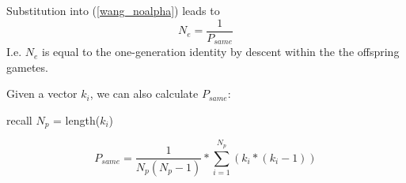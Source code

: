 \documentclass{article}
\begin{document}
\begin{description}
Substitution into (\ref{wang_noalpha}) leads to 
\begin{equation} 
N_e = \frac{1}{P_{same}}
\end{equation}
I.e. $N_e$ is equal to the one-generation identity by descent within the the offspring gametes.

\item Given a vector $k_i$, we can also calculate $P_{same}$:

recall $N_p$ = length($k_i$)

\begin{equation}
P_{same} = \frac{1}{N_p(N_p-1)} * \sum_{i=1}^{N_p} (k_i*(k_i-1))
\end{equation}


\end{description}
\end{document}
